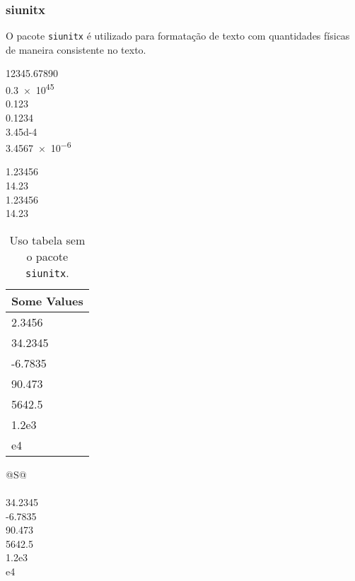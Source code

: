 \begin{frame}
\frametitle{siunitx}

O pacote \texttt{siunitx} é utilizado para formatação de texto com quantidades físicas de maneira consistente no texto.

\begin{LTXexample}
\num{12345,67890}  \\
\num{.3e45}        \\
\num{0.123}   \\
\num{0,1234}  \\
\num{3.45d-4} \\
\num{3.4567e-6} 
\end{LTXexample}

\framebreak

\begin{LTXexample}
\num{1.23456}     \\
\num{14.23}      \\
%
\num{1.23456}     \\
\num{14.23}      \\
\end{LTXexample}

\framebreak

\begin{LTXexample}
\begin{table}\caption{Uso tabela sem o pacote \texttt{siunitx}.}
\begin{tabular}{l}
\toprule{Some Values} \\
\midrule 
2.3456 \\ 34.2345 \\ -6.7835 \\ 90.473  \\ 5642.5    \\ 1.2e3 \\ e4  \\
\bottomrule
\end{tabular}
\end{table}
\end{LTXexample}

\framebreak 

\begin{LTXexample}
\begin{table}\caption{Standard behaviour of the \texttt{S} column type.%
\label{tab-S-standard}}
\begin{tabular}{@{}S@{}}
 \\
 \\ 34.2345 \\ -6.7835 \\ 90.473  \\ 5642.5    \\ 1.2e3 \\ e4  \\
\bottomrule
\end{tabular}
\end{table}
\end{LTXexample}



\end{frame}
